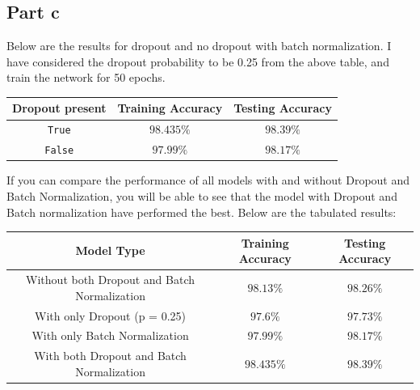 \documentclass{article}
\begin{document}
\subsection*{Part c}
\begin{flushleft}
Below are the results for dropout and no dropout with batch normalization. I have considered the dropout probability to be 0.25 from the above table, and train the network for 50 epochs.
\begin{center}
\begin{tabular}{|c|c|c|}
\hline
Dropout present & Training Accuracy & Testing Accuracy\\
\hline
\hline
\texttt{True} & \(98.435\%\) & \(98.39\%\)\\
\hline
\texttt{False} & \(97.99\%\) & \(98.17\%\)\\
\hline
\end{tabular}
\end{center}

If you can compare the performance of all models with and without Dropout and Batch Normalization, you will be able to see that the model with Dropout and Batch normalization have performed the best. Below are the tabulated results:
\begin{center}
\begin{tabular}{|c|c|c|}
\hline
Model Type & Training Accuracy & Testing Accuracy\\
\hline
\hline
Without both Dropout and Batch Normalization & \(98.13\%\) & \(98.26\%\)\\
\hline
With only Dropout (p = 0.25) & \(97.6\%\) & \(97.73\%\)\\
\hline
With only Batch Normalization & \(97.99\%\) & \(98.17\%\)\\
\hline
With both Dropout and Batch Normalization & \(\mathbf{98.435}\%\) & \(\mathbf{98.39}\%\) \\
\hline
\end{tabular}
\end{center}
\end{flushleft}
\end{document}

